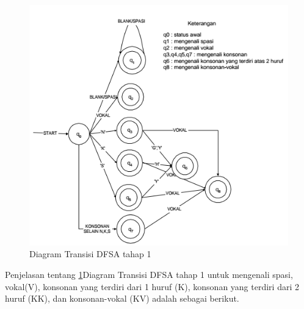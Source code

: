 \begin{figure}[H]
	\centering
	\includegraphics[scale=1.3]{Gambar/DFSA-1}
	\caption{Diagram Transisi DFSA tahap 1\cite{Thomas:2000}} 
	\label{fig:1-DFSA-1}
\end{figure}

Penjelasan tentang \ref{fig:1-DFSA-1}Diagram Transisi DFSA tahap 1 untuk mengenali spasi, vokal(V), konsonan yang terdiri dari 1 huruf (K), konsonan yang terdiri dari 2 huruf (KK), dan konsonan-vokal (KV) adalah sebagai berikut.

